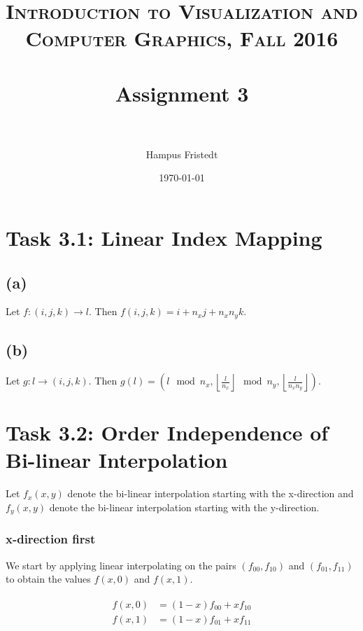 \documentclass[paper=a4, fontsize=11pt]{scrartcl} %
\title{	
  \normalfont \normalsize 
  \textsc{Introduction to Visualization and Computer Graphics, Fall 2016} \\ [25pt] %
  \horrule{0.5pt} \\[0.4cm] %
  \huge Assignment 3\\ %
  \horrule{2pt} \\[0.5cm] %
}
\author{Hampus Fristedt} %
\date{\normalsize\today} %
\numberwithin{equation}{section} %
\numberwithin{figure}{section} %
\numberwithin{table}{section} %
\begin{document}
\maketitle %


\section*{Task 3.1: Linear Index Mapping}

\subsection*{(a)}

Let $f: (i, j, k) \rightarrow l$. Then $f(i, j, k) = i + n_xj + n_xn_yk$.

\subsection*{(b)}

Let $g: l \rightarrow (i, j, k)$. Then $g(l) = (l \mod n_x, \left \lfloor\frac{l}{n_x} \right \rfloor \mod n_y, \left \lfloor\frac{l}{n_xn_y} \right \rfloor)$.

\section*{Task 3.2: Order Independence of Bi-linear Interpolation}

Let $f_x(x, y)$ denote the bi-linear interpolation starting with the x-direction and $f_y(x, y)$ denote the bi-linear interpolation starting with the y-direction.

\subsubsection*{x-direction first}

We start by applying linear interpolating on the pairs $(f_{00}, f_{10})$ and $(f_{01}, f_{11})$ to obtain the values $f(x, 0)$ and $f(x, 1)$.

\begin{align*}
  \begin{split}
    f(x, 0) &= (1 - x)f_{00} + xf_{10}\\
    f(x, 1) &= (1 - x)f_{01} + xf_{11}
  \end{split}
\end{align*}
\end{document}
